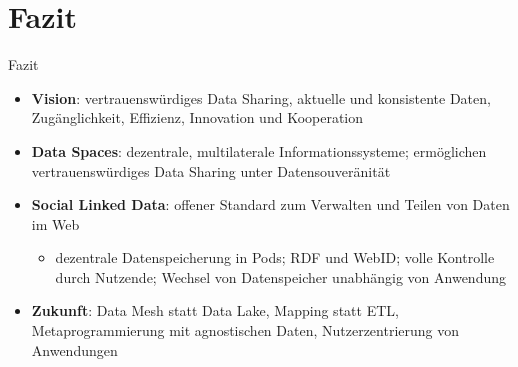 
\section{Fazit}

\begin{frame}{Fazit}
    \begin{itemize}
        \item \textbf{Vision}: vertrauenswürdiges Data Sharing, aktuelle und konsistente Daten, Zugänglichkeit, Effizienz, Innovation und Kooperation
        
        \pause
        \item \textbf{Data Spaces}: dezentrale, multilaterale Informationssysteme; ermöglichen vertrauenswürdiges Data Sharing unter Datensouveränität
        
        \pause
        \item \textbf{Social Linked Data}: offener Standard zum Verwalten und Teilen von Daten im Web
        
        \pause
        \begin{itemize}
            \item dezentrale Datenspeicherung in Pods; RDF und WebID; volle Kontrolle durch Nutzende; Wechsel von Datenspeicher unabhängig von Anwendung
        \end{itemize}
        
        \pause
        \item \textbf{Zukunft}: Data  Mesh statt Data Lake, Mapping statt ETL, Metaprogrammierung mit agnostischen Daten, Nutzerzentrierung von Anwendungen
    \end{itemize}
\end{frame}
